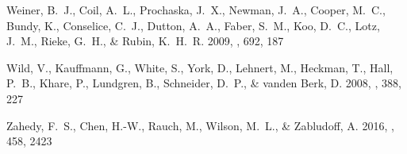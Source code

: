 \documentclass[iop]{emulateapj}
\begin{document}
\begin{thebibliography}{61}
{Weiner}, B.~J., {Coil}, A.~L., {Prochaska}, J.~X., {Newman}, J.~A., {Cooper},
  M.~C., {Bundy}, K., {Conselice}, C.~J., {Dutton}, A.~A., {Faber}, S.~M.,
  {Koo}, D.~C., {Lotz}, J.~M., {Rieke}, G.~H., \& {Rubin}, K.~H.~R. 2009, \apj,
  692, 187

{Wild}, V., {Kauffmann}, G., {White}, S., {York}, D., {Lehnert}, M., {Heckman},
  T., {Hall}, P.~B., {Khare}, P., {Lundgren}, B., {Schneider}, D.~P., \&
  {vanden Berk}, D. 2008, \mnras, 388, 227

{Zahedy}, F.~S., {Chen}, H.-W., {Rauch}, M., {Wilson}, M.~L., \& {Zabludoff},
  A. 2016, \mnras, 458, 2423

\end{thebibliography}
\end{document}
